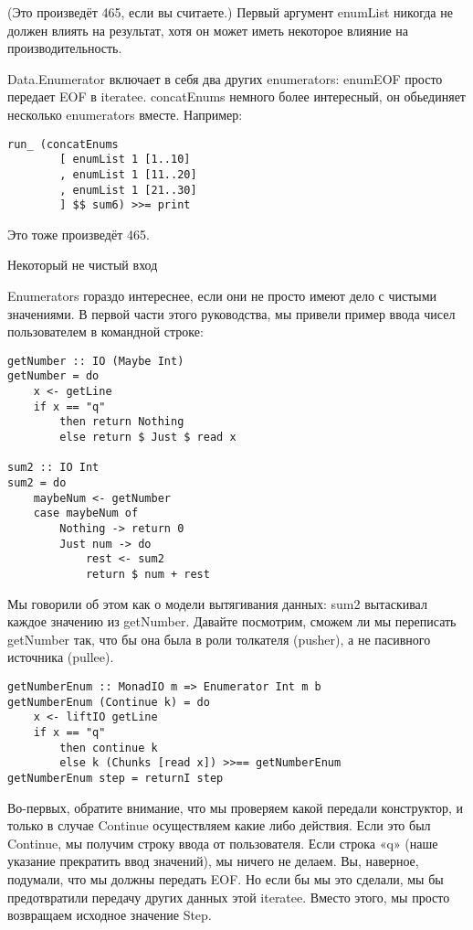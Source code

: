 (Это произведёт 465, если вы считаете.) Первый аргумент enumList никогда не должен влиять на результат, хотя он может иметь некоторое влияние на производительность.

Data.Enumerator включает в себя два других enumerators: enumEOF просто передает EOF в iteratee. concatEnums немного более интересный, он обьединяет несколько enumerators вместе. Например:

\begin{lstlisting}
run_ (concatEnums
        [ enumList 1 [1..10]
        , enumList 1 [11..20]
        , enumList 1 [21..30]
        ] $$ sum6) >>= print
\end{lstlisting}

Это тоже произведёт 465.

Некоторый не чистый вход

Enumerators гораздо интереснее, если они не просто имеют дело с чистыми значениями. В первой части этого руководства, мы привели пример ввода чисел пользователем в командной строке:

\begin{lstlisting}
getNumber :: IO (Maybe Int)
getNumber = do
    x <- getLine
    if x == "q"
        then return Nothing
        else return $ Just $ read x

sum2 :: IO Int
sum2 = do
    maybeNum <- getNumber
    case maybeNum of
        Nothing -> return 0
        Just num -> do
            rest <- sum2
            return $ num + rest
\end{lstlisting}

Мы говорили об этом как о модели вытягивания данных: sum2 вытаскивал каждое значению из getNumber. Давайте посмотрим, сможем ли мы переписать getNumber так, что бы она была в роли толкателя (pusher), а не пасивного источника (pullee).

\begin{lstlisting}
getNumberEnum :: MonadIO m => Enumerator Int m b
getNumberEnum (Continue k) = do
    x <- liftIO getLine
    if x == "q"
        then continue k
        else k (Chunks [read x]) >>== getNumberEnum
getNumberEnum step = returnI step
\end{lstlisting}

Во-первых, обратите внимание, что мы проверяем какой передали конструктор, и только в случае Continue осуществляем какие либо действия. Если это был Continue, мы получим строку ввода от пользователя. Если строка «q» (наше указание прекратить ввод значений), мы ничего не делаем. Вы, наверное, подумали, что мы должны передать EOF. Но если бы мы это сделали, мы бы предотвратили передачу других данных этой iteratee. Вместо этого, мы просто возвращаем исходное значение Step.

